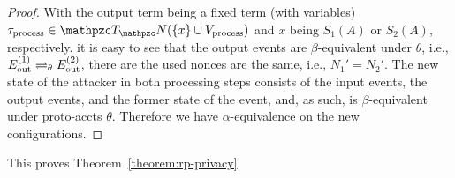 \begin{proof}
    With the output term being a fixed term (with variables)
    $\tau_{\text{process}} \in \terms(\{x\} \cup V_\text{process})$ 
    and $x$ being $S_1(A)$ or $S_2(A)$, respectively. 
    it is easy to see that the output events are 
    $\beta$-equivalent under $\theta$, i.e., 
    $E ^{(1)}_\text{out} \rightleftharpoons_{\theta} E^{(2)}_\text{out}$, there
    are the used nonces are the same, i.e., $N_1' = N_2'$. 
    The new state of the attacker in both processing steps 
    consists of the input events, the output events, and the 
    former state of the event, and, as such, is 
    $\beta$-equivalent under proto-accts $\theta$. 
    Therefore we have $\alpha$-equivalence on the new configurations.
  \end{proof}
  
  This proves Theorem~\ref{theorem:rp-privacy}.\QED
  
  
  